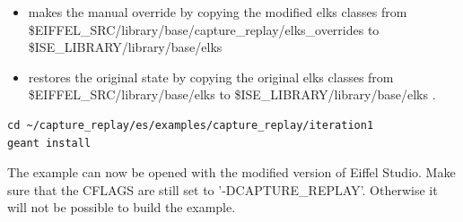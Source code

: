\begin{itemize}
\item {} makes the manual override by copying the modified elks classes from \$EIFFEL\_SRC/library/base/capture\_replay/elks\_overrides to \$ISE\_LIBRARY/library/base/elks \\
\item {} restores the original state by copying the original elks classes from \$EIFFEL\_SRC/library/base/elks to \$ISE\_LIBRARY/library/base/elks .
\end{itemize}

\begin{lstlisting}
cd ~/capture_replay/es/examples/capture_replay/iteration1
geant install
\end{lstlisting}

The example can now be opened with the modified version of Eiffel Studio. Make sure that the CFLAGS are still set to '-DCAPTURE\_REPLAY'. Otherwise it will not be possible to build the example.

\fussy